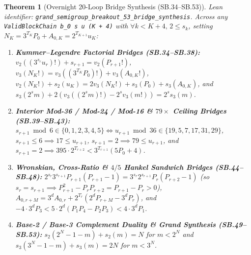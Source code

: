 \documentclass[11pt]{article}
\newtheorem{theorem}{Theorem}[section]
\begin{document}
\begin{theorem}[Overnight 20-Loop Bridge Synthesis (SB.34--SB.53)]
\emph{Lean identifier:} \nolinkurl{grand_semigroup_breakout_53_bridge_synthesis}.
Across any \texttt{ValidBlockChain b\_0 s u (K + 4)} with $\forall k < K + 4,\, 2 \le s_k$, setting $N_K = 3^{T_K} P_0 + A_{0,K} = 2^{T_{K+1}} u_K$:
\begin{enumerate}
  \item \textbf{Kummer--Legendre Factorial Bridges (SB.34--SB.38):} $v_2((3^{s_r} u_r)!) + s_{r+1} = v_2(P_{r+1}!)$, $v_3(N_K!) = v_3((3^{T_K} P_0)!) + v_3(A_{0,K}!)$, $v_2(N_K!) + s_2(u_K) = 2 v_3(N_K!) + s_3(P_0) + s_3(A_{0,K})$, and $s_3(2^s m) + 2(v_3((2^s m)!) - 2^s v_3(m!)) = 2^s s_3(m)$.
  \item \textbf{Interior Mod-36 / Mod-24 / Mod-16 \& $79\times$ Ceiling Bridges (SB.39--SB.43):} $s_{r+1} \bmod 6 \in \{0,1,2,3,4,5\} \iff u_{r+1} \bmod 36 \in \{19,5,7,17,31,29\}$, $s_{r+1} \le 6 \implies 17 \le u_{r+1}$, $s_{r+1} = 2 \implies 79 \le u_{r+1}$, and $s_{r+1} = 2 \implies 395 \cdot 2^{T_{r+2}} < 3^{T_{r+1}}(5 P_0 + 4)$.
  \item \textbf{Wronskian, Cross-Ratio \& $4/5$ Hankel Sandwich Bridges (SB.44--SB.48):} $2^{s_r} 3^{s_{r+1}} P_{r+1}(P_{r+1}-1) = 3^{s_r} 2^{s_{r+1}} P_r(P_{r+2}-1)$ (so $s_r = s_{r+1} \implies P_{r+1}^2 - P_r P_{r+2} = P_{r+1} - P_r > 0$), $A_{0,r+M} = 3^d A_{0,r} + 2^{T_r}(2^d P_{r+M} - 3^d P_r)$, and $-4 \cdot 3^d P_3 < 5 \cdot 2^d(P_1 P_4 - P_2 P_3) < 4 \cdot 3^d P_1$.
  \item \textbf{Base-2 / Base-3 Complement Duality \& Grand Synthesis (SB.49--SB.53):} $s_2(2^N - 1 - m) + s_2(m) = N$ for $m < 2^N$ and $s_3(3^N - 1 - m) + s_3(m) = 2N$ for $m < 3^N$.
\end{enumerate}
\end{theorem}
\end{document}
